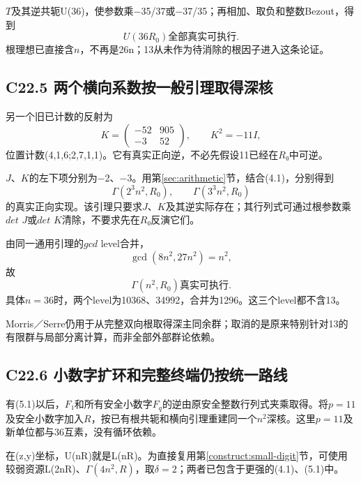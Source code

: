 \documentclass[11pt,a4paper]{article}
\theoremstyle{definition}
\numberwithin{equation}{section}
\begin{document}
{\ensuremath{T}及其逆共轭U(36)，使参数乘−35/37或−37/35；再相加、取负和整数Bezout，得到} \[
\boxed{U(36R_0)\text{全部真实可执行}.}
\tag{C22.4.1}
\] {根理想已直接含\ensuremath{n}，不再是26n；13从未作为待消除的根因子进入这条论证。}

\subsection*{\texorpdfstring{{C22.5} {两个横向系数按一般引理取得深核}}{C22.5 两个横向系数按一般引理取得深核}}\label{C22-h150}

{另一个旧已计数的反射为} \[
K=\begin{pmatrix}-52&905\\-3&52\end{pmatrix},
\qquad K^2=-11I,
\] {位置计数(4,1,6;2,7,1,1)。它有真实正向逆，不必先假设11已经在\ensuremath{R}₀中可逆。}

{\ensuremath{J}、\ensuremath{K}的左下项分别为−2、−3。用}第\ref{sec:arithmetic}节{，结合(4.1)，分别得到} \[
\Gamma(2^3n^2,R_0),\qquad
\Gamma(3^3n^2,R_0)
\] {的真实正向实现。该引理只要求\ensuremath{J}、\ensuremath{K}及其逆实际存在；其行列式可通过根参数乘\ensuremath{det}} {\ensuremath{J}或\ensuremath{det}} {\ensuremath{K}清除，不要求先在\ensuremath{R}₀反演它们。}

{由同一通用引理的\ensuremath{gcd}} {level合并，} \[
\gcd(8n^2,27n^2)=n^2,
\] {故} \[
\boxed{\Gamma(n^2,R_0)\text{真实可执行}.}
\tag{C22.5.1}
\] {具体\ensuremath{n=36}时，两个level为10368、34992，合并为1296。这三个level都不含13。}

{Morris／Serre仍用于从完整双向根取得深主同余群；取消的是原来特别针对13的有限群与局部分离计算，而非全部外部群论依赖。}

\subsection*{\texorpdfstring{{C22.6} {小数字扩环和完整终端仍按统一路线}}{C22.6 小数字扩环和完整终端仍按统一路线}}\label{C22-h151}

{有(5.1)以后，\ensuremath{F}₁和所有安全小数字\ensuremath{F_{q}}的逆由原安全整数行列式夹乘取得。将\ensuremath{p=11}及安全小数字加入\ensuremath{R}，按已有根共轭和横向引理重建同一个\ensuremath{n^{2}}深核。这里\ensuremath{p=11}及新单位都与36互素，没有循环依赖。}

{在(z,y)坐标，U(nR)就是L(nR)。为直接复用}第\ref{construct:small-digit}节{，可使用较弱资源L(2nR)、\ensuremath{\Gamma (4n^{2},R)}，取\ensuremath{\delta =2}；两者已包含于更强的(4.1)、(5.1)中。}
\end{document}
